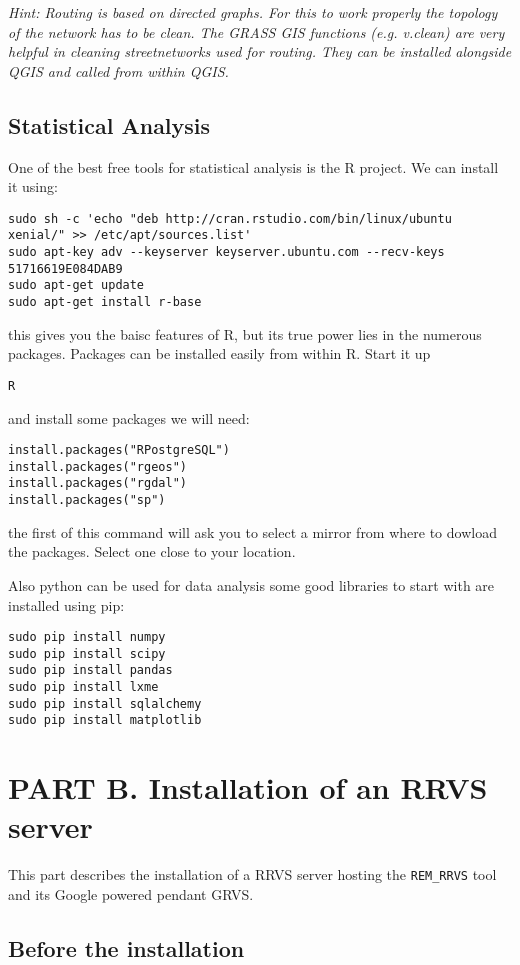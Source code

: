\documentclass{article}
\begin{document}
\textit{Hint: Routing is based on directed graphs. For this
to work properly the topology of the network has to be clean.
The GRASS GIS functions (e.g. v.clean) are very helpful in cleaning
streetnetworks used for routing. They can be installed alongside
QGIS and called from within QGIS.}

\subsection{Statistical Analysis}
One of the best free tools for statistical analysis 
is the R project.
We can install it using:
\begin{verbatim}
sudo sh -c 'echo "deb http://cran.rstudio.com/bin/linux/ubuntu xenial/" >> /etc/apt/sources.list'
sudo apt-key adv --keyserver keyserver.ubuntu.com --recv-keys 51716619E084DAB9
sudo apt-get update
sudo apt-get install r-base
\end{verbatim}
this gives you the baisc features of R, but its true power lies
in the numerous packages. Packages can be installed easily from
within R. Start it up 
\begin{verbatim}
R
\end{verbatim}
and install some packages we will need:
\begin{verbatim}
install.packages("RPostgreSQL")
install.packages("rgeos")
install.packages("rgdal")
install.packages("sp")
\end{verbatim}
the first of this command will ask you to select a mirror from
where to dowload the packages. Select one close to your location.

Also python can be used for data analysis some good libraries
to start with are installed using pip:

\begin{verbatim}
sudo pip install numpy
sudo pip install scipy
sudo pip install pandas
sudo pip install lxme
sudo pip install sqlalchemy
sudo pip install matplotlib
\end{verbatim}


\section{PART B. Installation of an RRVS server}

This part describes the installation of a RRVS server hosting
the \verb|REM_RRVS| tool and its Google powered pendant GRVS.

\subsection{Before the installation}
\end{document}
